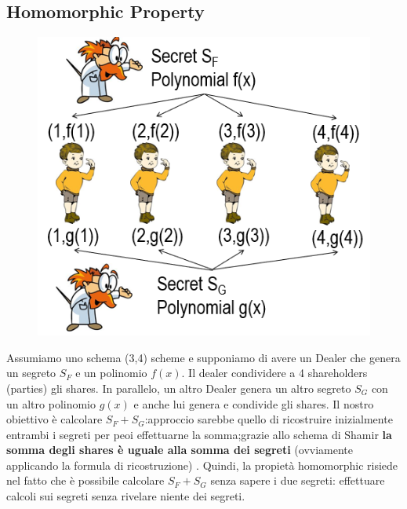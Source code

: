 \documentclass{book}
\begin{document}
\subsection{Homomorphic Property}
\setlength\intextsep{0pt}
\begin{figure}
    \centering
    \includegraphics[scale=0.5]{2021-12-29-21-48-24.png}%
\end{figure}
Assumiamo uno schema (3,4) scheme e supponiamo di avere un Dealer che genera un segreto \(S_{F}\) e un polinomio \(f(x)\).
Il dealer condividere a 4 shareholders (parties) gli shares.
In parallelo, un altro Dealer genera un altro segreto \(S_{G}\) con un altro polinomio \(g(x)\) e anche lui genera e condivide gli shares\@.\newline
Il nostro obiettivo è calcolare \(S_{F}+S_{G}\):\@ approccio sarebbe quello di ricostruire inizialmente entrambi i segreti per peoi effettuarne la somma;\@tuttavia grazie allo schema di Shamir \textbf{la somma degli shares è uguale alla somma dei segreti} (ovviamente applicando la formula di ricostruzione) \@.
Quindi, la propietà homomorphic risiede nel fatto che è possibile calcolare \(S_{F}+S_{G}\) senza sapere i due segreti: effettuare calcoli sui segreti senza rivelare niente dei segreti\@.
\end{document}
